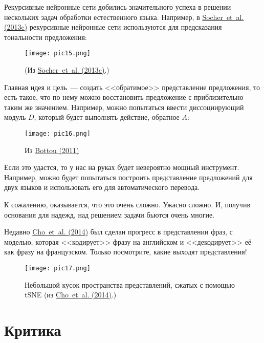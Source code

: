 \documentclass[a4paper,12pt]{article}
\begin{document}
Рекурсивные нейронные сети добились значительного успеха в решении нескольких задач обработки естественного языка. Например, в \href{http://nlp.stanford.edu/~socherr/EMNLP2013_RNTN.pdf}{Socher~et~al. (2013c)} рекурсивные нейронные сети используются для предсказания тональности предложения:

\begin{figure}[t]
\begin{center}
\texttt{[image: pic15.png]}
\caption{(Из \href{http://nlp.stanford.edu/~socherr/EMNLP2013_RNTN.pdf}{Socher~et~al. (2013c)}.)}
\end{center}
\end{figure}

Главная идея и цель~--- создать <<обратимое>> представление предложения, то есть такое, что по нему можно восстановить предложение с приблизительно таким же значением. Например, можно попытаться ввести диссоциирующий модуль $D$, который будет выполнять действие, обратное $A$:

\begin{figure}[t]
\begin{center}
\texttt{[image: pic16.png]}
\caption{Из \href{http://arxiv.org/pdf/1102.1808v3.pdf}{Bottou (2011)}}
\end{center}
\end{figure}

Если это удастся, то у нас на руках будет невероятно мощный инструмент. Например, можно будет попытаться построить представление предложений для двух языков и использовать его для автоматического перевода.

К сожалению, оказывается, что это очень сложно. Ужасно сложно. И, получив основания для надежд, над решением задачи бьются очень многие.

Недавно  \href{http://arxiv.org/pdf/1406.1078v1.pdf}{Cho~et~al. (2014)} был сделан прогресс в представлении фраз, с моделью, которая <<кодирует>> фразу на английском и <<декодирует>> её как фразу на французском. Только посмотрите, какие выходят представления!

\begin{figure}[t]
\begin{center}
\texttt{[image: pic17.png]}
\caption{Небольшой кусок пространства представлений, сжатых с помощью tSNE (из \href{http://arxiv.org/pdf/1406.1078v1.pdf}{Cho~et~al. (2014)}.)}
\end{center}
\end{figure}

\section*{Критика}
\end{document}
